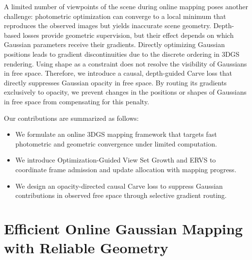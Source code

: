 \documentclass[nth=33]{humantech}
\begin{document}
A limited number of viewpoints of the scene during online mapping poses another challenge: photometric optimization can converge to a local minimum that reproduces the observed images but yields inaccurate scene geometry.
Depth-based losses provide geometric supervision, but their effect depends on which Gaussian parameters receive their gradients. Directly optimizing Gaussian positions leads to gradient discontinuities due to the discrete ordering in 3DGS rendering. Using shape as a constraint does not resolve the visibility of Gaussians in free space.
Therefore, we introduce a causal, depth-guided Carve loss that directly suppresses Gaussian opacity in free space.
By routing its gradients exclusively to opacity, we prevent changes in the positions or shapes of Gaussians in free space from compensating for this penalty.

Our contributions are summarized as follows:
\begin{itemize}
    \item We formulate an online 3DGS mapping framework that targets fast photometric and geometric convergence under limited computation.
    \item We introduce Optimization-Guided View Set Growth and ERVS to coordinate frame admission and update allocation with mapping progress.
    \item We design an opacity-directed causal Carve loss to suppress Gaussian contributions in observed free space through selective gradient routing.
\end{itemize}

\section{Efficient Online Gaussian Mapping with Reliable Geometry}
\label{sec:method}
\end{document}
